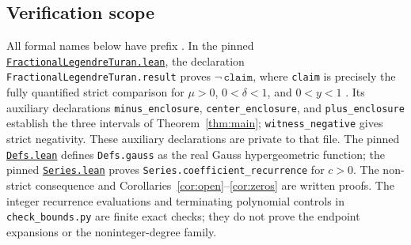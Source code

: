 \documentclass[11pt]{article}
\begin{document}
\subsection*{Verification scope}
\begingroup
\raggedright
All formal names below have prefix
.
In the pinned \href{https://github.com/the-omega-institute/trureturing/blob/b8d708b1b89112061f30f218f031c1bf3672ebd8/D5/S3/Analytic/GaussZeroBalanced/FractionalLegendreTuran.lean}{\texttt{FractionalLegendreTuran.lean}},
the declaration \texttt{FractionalLegendreTuran.result}
proves $\neg\,\texttt{claim}$, where \texttt{claim} is precisely the
fully quantified strict comparison for $\mu>0$, $0<\delta<1$,
and $0<y<1$ \cite{lean}.
Its auxiliary declarations \texttt{minus\_enclosure},
\texttt{center\_enclosure}, and \texttt{plus\_enclosure} establish
the three intervals of Theorem~\ref{thm:main}; \texttt{witness\_negative}
gives strict negativity. These auxiliary declarations are private to
that file. The pinned
\href{https://github.com/the-omega-institute/trureturing/blob/b8d708b1b89112061f30f218f031c1bf3672ebd8/D5/S3/Analytic/GaussZeroBalanced/Defs.lean}{\texttt{Defs.lean}}
defines \texttt{Defs.gauss} as the real Gauss hypergeometric function;
the pinned
\href{https://github.com/the-omega-institute/trureturing/blob/b8d708b1b89112061f30f218f031c1bf3672ebd8/D5/S3/Analytic/GaussZeroBalanced/Series.lean}{\texttt{Series.lean}}
proves \texttt{Series.coefficient\_recurrence} for $c>0$.
The non-strict consequence and Corollaries~\ref{cor:open}--\ref{cor:zeros}
are written proofs. The integer recurrence evaluations and terminating
polynomial controls in \texttt{check\_bounds.py} are finite exact checks;
they do not prove the endpoint expansions or the noninteger-degree family.
\par\endgroup
\end{document}
